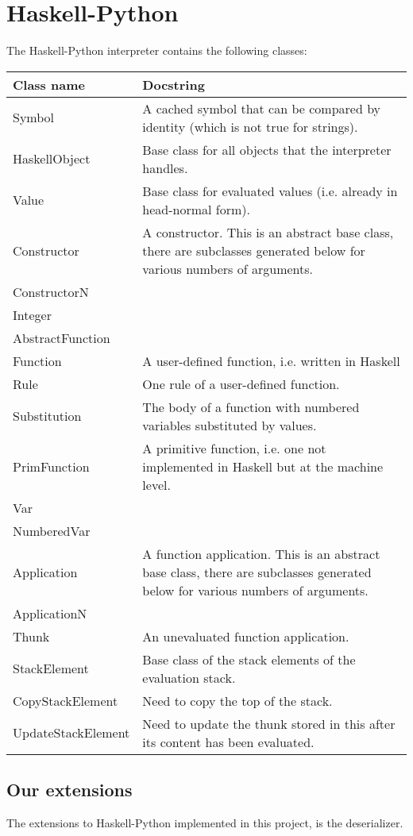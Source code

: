 \section{Haskell-Python}

The Haskell-Python interpreter contains the following classes:

\begin{longtable}{|p{1.5in}|p{3in}|}
\hline
Class name 	& Docstring \\
\hline \hline
Symbol 			& A cached symbol that can be compared by identity (which is not true for strings). \\
\hline
HaskellObject 		& Base class for all objects that the interpreter handles. \\
\hline
Value			& Base class for evaluated values (i.e. already in head-normal form). \\
\hline
Constructor		& A constructor. This is an abstract base class, there are subclasses generated below for various numbers of arguments.\\
\hline
ConstructorN		& \\
\hline
Integer			& \\
\hline
AbstractFunction	& \\
\hline
Function		& A user-defined function, i.e. written in Haskell \\
\hline
Rule			& One rule of a user-defined function. \\
\hline
Substitution		& The body of a function with numbered variables substituted by values. \\
\hline
PrimFunction		& A primitive function, i.e. one not implemented in Haskell but at the machine level. \\
\hline
Var			& \\
\hline
NumberedVar		& \\
\hline
Application		& A function application. This is an abstract base class, there are subclasses generated below for various numbers of arguments. \\
\hline
ApplicationN		& \\
\hline
Thunk			& An unevaluated function application. \\
\hline
StackElement		& Base class of the stack elements of the evaluation stack. \\
\hline
CopyStackElement	& Need to copy the top of the stack. \\
\hline
UpdateStackElement	& Need to update the thunk stored in this after its content has been evaluated. \\
\hline

\end{longtable}

\subsection{Our extensions}

The extensions to Haskell-Python implemented in this project, is the deserializer.
